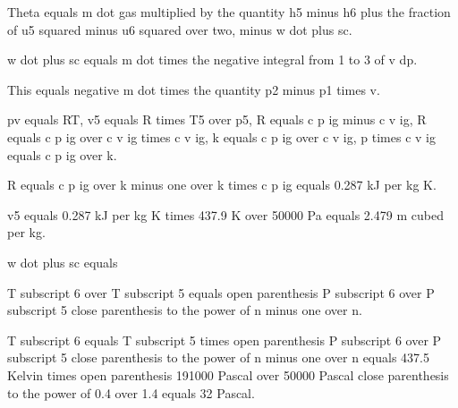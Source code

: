 Theta equals m dot gas multiplied by the quantity h5 minus h6 plus the fraction of u5 squared minus u6 squared over two, minus w dot plus sc. 

w dot plus sc equals m dot times the negative integral from 1 to 3 of v dp.

This equals negative m dot times the quantity p2 minus p1 times v.

pv equals RT, v5 equals R times T5 over p5, R equals c p ig minus c v ig, R equals c p ig over c v ig times c v ig, k equals c p ig over c v ig, p times c v ig equals c p ig over k.

R equals c p ig over k minus one over k times c p ig equals 0.287 kJ per kg K.

v5 equals 0.287 kJ per kg K times 437.9 K over 50000 Pa equals 2.479 m cubed per kg.

w dot plus sc equals

T subscript 6 over T subscript 5 equals open parenthesis P subscript 6 over P subscript 5 close parenthesis to the power of n minus one over n.

T subscript 6 equals T subscript 5 times open parenthesis P subscript 6 over P subscript 5 close parenthesis to the power of n minus one over n equals 437.5 Kelvin times open parenthesis 191000 Pascal over 50000 Pascal close parenthesis to the power of 0.4 over 1.4 equals 32 Pascal.